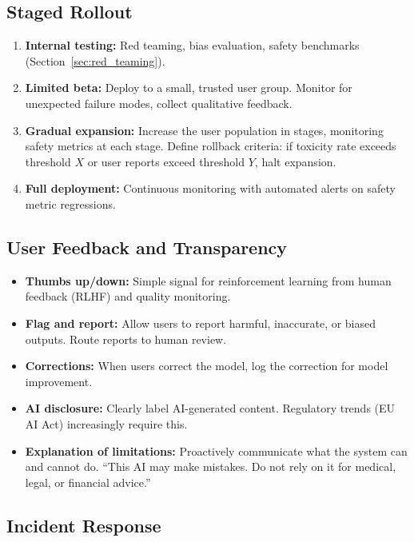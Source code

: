 \subsection{Staged Rollout}

\begin{enumerate}[label=\textbf{\arabic*.}]
    \item \textbf{Internal testing:} Red teaming, bias evaluation,
    safety benchmarks (Section~\ref{sec:red_teaming}).
    \item \textbf{Limited beta:} Deploy to a small, trusted user group.
    Monitor for unexpected failure modes, collect qualitative feedback.
    \item \textbf{Gradual expansion:} Increase the user population in
    stages, monitoring safety metrics at each stage.  Define rollback
    criteria: if toxicity rate exceeds threshold $X$ or user reports
    exceed threshold $Y$, halt expansion.
    \item \textbf{Full deployment:} Continuous monitoring with automated
    alerts on safety metric regressions.
\end{enumerate}

\subsection{User Feedback and Transparency}

\begin{itemize}
    \item \textbf{Thumbs up/down:} Simple signal for reinforcement learning
    from human feedback (RLHF) and quality monitoring.
    \item \textbf{Flag and report:} Allow users to report harmful, inaccurate,
    or biased outputs.  Route reports to human review.
    \item \textbf{Corrections:} When users correct the model, log the
    correction for model improvement.
    \item \textbf{AI disclosure:} Clearly label AI-generated content.
    Regulatory trends (EU AI Act) increasingly require this.
    \item \textbf{Explanation of limitations:} Proactively communicate what
    the system can and cannot do.  ``This AI may make mistakes.  Do not rely
    on it for medical, legal, or financial advice.''
\end{itemize}

\subsection{Incident Response}

